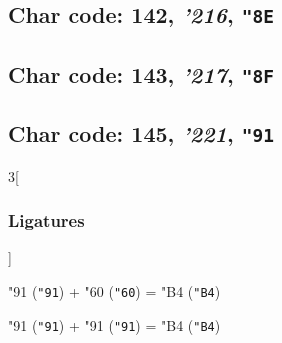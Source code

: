 \documentclass{article}
\newlength{\maxcharwidth}
\begin{document}
\subsection{Char code: 142, {\it'216}, {\tt"8E}}
\label{char_142}


\subsection{Char code: 143, {\it'217}, {\tt"8F}}
\label{char_143}


\subsection{Char code: 145, {\it'221}, {\tt"91}}
\label{char_145}


\begin{multicols}{3}[\subsubsection{Ligatures}]

{\testfont\char"91\noboundary} ({\tt"91}) + {\testfont\char"60\noboundary} ({\tt"60}) = {\testfont\char"B4\noboundary} ({\tt"B4}) 

{\testfont\char"91\noboundary} ({\tt"91}) + {\testfont\char"91\noboundary} ({\tt"91}) = {\testfont\char"B4\noboundary} ({\tt"B4}) 

\end{multicols}
\end{document}
